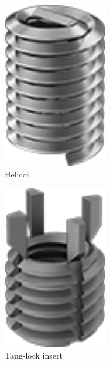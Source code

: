 \documentclass[10pt,letterpaper]{book}
\begin{document}
	\begin{figure}[H]
		\centering
		\begin{subfigure}[b]{.24\linewidth}
			\includegraphics[width=0.5\textwidth]{imgs/helicoil.png}
			\caption{Helicoil}
		\end{subfigure}\begin{subfigure}[b]{.24\linewidth}
			\includegraphics[width=0.5\textwidth]{imgs/tanglock.png}
			\caption{Tang-lock insert}
		\end{subfigure}\begin{subfigure}[b]{.24\linewidth}

\end{subfigure}
\end{figure}
\end{document}
